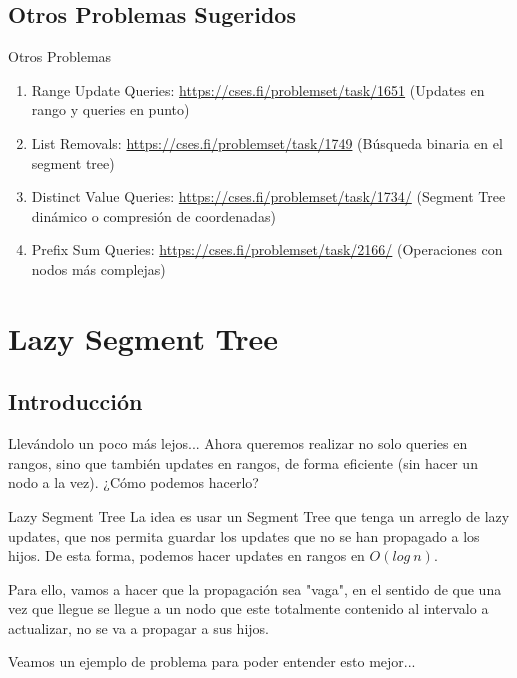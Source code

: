 \documentclass{beamer}
\begin{document}
\subsection{Otros Problemas Sugeridos}

\begin{frame}{Otros Problemas}
\begin{enumerate}
    \item Range Update Queries: \url{https://cses.fi/problemset/task/1651} (Updates en rango y queries en punto)
    \item List Removals: \url{https://cses.fi/problemset/task/1749} (Búsqueda binaria en el segment tree)
    \item Distinct Value Queries: \url{https://cses.fi/problemset/task/1734/} (Segment Tree dinámico o compresión de coordenadas)
    \item Prefix Sum Queries: \url{https://cses.fi/problemset/task/2166/} (Operaciones con nodos más complejas) 
\end{enumerate}
\end{frame}

\section{Lazy Segment Tree}
\subsection{Introducción}

\begin{frame}{Llevándolo un poco más lejos...}
Ahora queremos realizar no solo queries en rangos, sino que también updates en rangos, de forma eficiente (sin hacer un nodo a la vez). ¿Cómo podemos hacerlo?
\end{frame}

\begin{frame}{Lazy Segment Tree}
La idea es usar un Segment Tree que tenga un arreglo de lazy updates, que nos permita guardar los updates que no se han propagado a los hijos. De esta forma, podemos hacer updates en rangos en $O(log\:n)$.

\pause
Para ello, vamos a hacer que la propagación sea "vaga", en el sentido de que una vez que llegue se llegue a un nodo que este totalmente contenido al intervalo a actualizar, no se va a propagar a sus hijos.

\pause
Veamos un ejemplo de problema para poder entender esto mejor...
\end{frame}
\end{document}
